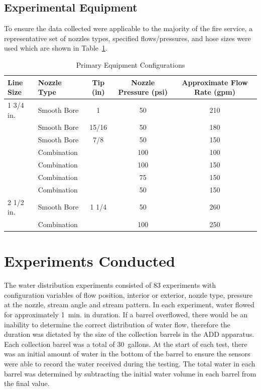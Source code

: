 \documentclass[12pt,oneside]{book}
\begin{document}
\subsection{Experimental Equipment}

To ensure the data collected were applicable to the majority of the fire service, a representative set of nozzles types, specified flows/pressures, and hose sizes were used which are shown in Table~\ref{tab:nozzles_used_detail}.

\begin{table}[!ht]
\centering
\caption{Primary Equipment Configurations}
\label{tab:nozzles_used_detail}
\begin{tabular}{llccc}
\toprule[1.5pt]
Line Size & Nozzle Type & Tip (in) & Nozzle Pressure (psi) & Approximate Flow Rate (gpm) \\ 
\midrule
1 3/4 in. & Smooth Bore          & 1      & 50 & 210 \\
          & Smooth Bore          & 15/16  & 50 & 180 \\
          & Smooth Bore          & 7/8    & 50 & 150 \\
          & Combination          &        & 100 & 100 \\
          & Combination          &        & 100 & 150 \\
          & Combination          &        & 75 & 150 \\
          & Combination          &        & 50 & 150 \\ \midrule
2 1/2 in. & Smooth Bore          & 1 1/4  & 50 & 260 \\
          & Combination          &        & 100 & 250 \\
\bottomrule[1.25pt]
\end{tabular}
\end{table}

\section{Experiments Conducted}

The water distribution experiments consisted of 83 experiments with configuration variables of flow position, interior or exterior, nozzle type, pressure at the nozzle, stream angle and stream pattern. In each experiment, water flowed for approximately 1~min. in duration. If a barrel overflowed, there would be an inability to determine the correct distribution of water flow, therefore the duration was dictated by the size of the collection barrels in the ADD apparatus. Each collection barrel was a total of 30~gallons.  At the start of each test, there was an initial amount of water in the bottom of the barrel to ensure the sensors were able to record the water received during the testing. The total water in each barrel was determined by subtracting the initial water volume in each barrel from the final value. 
\end{document}
